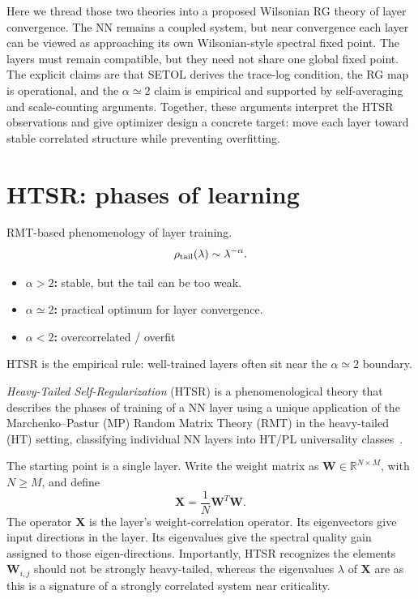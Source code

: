 \documentclass[10pt,twocolumn]{article}
\newcommand{\W}{\mathbf W}
\newcommand{\X}{\mathbf X}
\newcommand{\takeaway}[1]{%
  \par\vspace{4pt}\noindent\textcolor{boxblue}{#1}%
}
\newcommand{\eqtight}[1]{\[\vspace{-1pt}#1\vspace{-3pt}\]}
\begin{document}
Here we thread those two theories into a proposed Wilsonian RG theory of layer convergence. The NN remains a coupled system, but near convergence each layer can be viewed as approaching its own Wilsonian-style spectral fixed point. The layers must remain compatible, but they need not share one global fixed point. The explicit claims are that SETOL derives the trace-log condition, the RG map is operational, and the $\alpha\simeq2$ claim is empirical and supported by self-averaging and scale-counting arguments.
Together, these arguments interpret the HTSR observations and give optimizer design a concrete target: move each layer toward stable correlated structure
while preventing overfitting.

\section{HTSR: phases of learning}
\label{sxn:htsr}

\begin{tcolorbox}[marginalbox,title=\textbf{HTSR heavy-tailed phases}]
  RMT-based phenomenology of layer training.
\eqtight{\rho_{\rm tail}(\lambda)\sim\lambda^{-\alpha}.}
\begin{itemize}
\item \textbf{$\alpha>2$:} stable, but the tail can be too weak.
\item \textbf{$\alpha\simeq2$:} practical optimum for layer convergence.
\item \textbf{$\alpha<2$:} overcorrelated / overfit
\end{itemize}
\takeaway{HTSR is the empirical rule: well-trained layers often sit near the $\alpha\simeq2$ boundary.}
\end{tcolorbox}

\emph{Heavy-Tailed Self-Regularization} (HTSR) is a phenomenological theory that describes the phases of training
of a NN layer using a unique application of the Marchenko--Pastur (MP)
Random Matrix Theory (RMT) in the heavy-tailed (HT) setting, classifying individual
NN layers into HT/PL universality classes~\cite{MartinMahoneyJMLR2021}.

The starting point is a single layer.
Write the weight matrix as $\W\in\mathbb R^{N\times M}$, with $N\ge M$, and define
\begin{equation}
\X=\frac{1}{N}\W^T\W.
\label{eq:Xdef}
\end{equation}
The operator $\X$ is the layer's weight-correlation operator. Its eigenvectors give input directions in the layer. Its eigenvalues give the spectral quality gain assigned to those eigen-directions. Importantly, HTSR recognizes the elements $\W_{i,j}$ should not be strongly heavy-tailed, whereas
the eigenvalues $\lambda$ of $\X$ are as this is a signature of a strongly correlated system near criticality.
\end{document}
